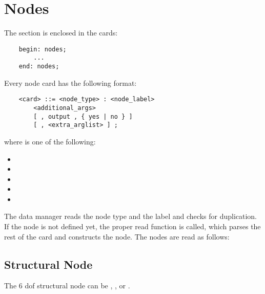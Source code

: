 %
%
%
%
%
% 
%
%

\chapter{Nodes}\label{sec:NODES}
The  section is enclosed in the cards:
\begin{verbatim}
    begin: nodes;
        ...
    end: nodes;
\end{verbatim}
Every node card has the following format:
\begin{verbatim}
    <card> ::= <node_type> : <node_label>
        <additional_args>
        [ , output , { yes | no } ]
        [ , <extra_arglist> ] ;
\end{verbatim}
where  is one of the following:
\begin{itemize}
    \item {}
    \item {}
    \item {}
    \item {}
    \item {}
\end{itemize}
The data manager reads the node type and the label and checks for
duplication. If the node is not defined yet, the proper read function is
called, which parses the rest of the card and constructs the node.
The nodes are read as follows:




\section{Structural Node}
\label{sec:NODE:STRUCTURAL}
The 6 dof structural node can be ,
,  or .

